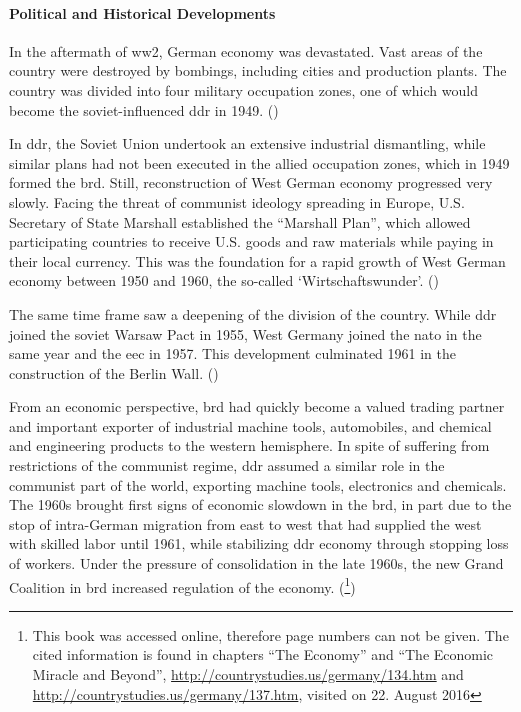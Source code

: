 \paragraph{Political and Historical Developments}
In the aftermath of \gls{ww2}, German economy was devastated. Vast areas of the country were destroyed by bombings, including cities and production plants. The country was divided into four military occupation zones, one of which would become the soviet-influenced \gls{ddr} in 1949. (\cite{BBC.2012})

In \gls{ddr}, the Soviet Union undertook an extensive industrial dismantling, while similar plans had not been executed in the allied occupation zones, which in 1949 formed the \gls{brd}. Still, reconstruction of West German economy progressed very slowly. Facing the threat of communist ideology spreading in Europe, U.S. Secretary of State Marshall established the ``Marshall Plan'', which allowed participating countries to receive U.S. goods and raw materials while paying in their local currency. This was the foundation for a rapid growth of West German economy between 1950 and 1960, the so-called `Wirtschaftswunder'. (\cite{Kimmel.2005})

The same time frame saw a deepening of the division of the country. While \gls{ddr} joined the soviet Warsaw Pact in 1955, West Germany joined the \gls{nato} in the same year and the \gls{eec} in 1957. This development culminated 1961 in the construction of the Berlin Wall. (\cite{BBC.2012})

From an economic perspective, \gls{brd} had quickly become a valued trading partner and important exporter of industrial machine tools, automobiles, and chemical and engineering products to the western hemisphere. In spite of suffering from restrictions of the communist regime, \gls{ddr} assumed a similar role in the communist part of the world, exporting machine tools, electronics and chemicals. The 1960s brought first signs of economic slowdown in the \gls{brd}, in part due to the stop of intra-German migration from east to west that had supplied the west with skilled labor until 1961, while stabilizing \gls{ddr} economy through stopping loss of workers. Under the pressure of consolidation in the late 1960s, the new Grand Coalition in \gls{brd} increased regulation of the economy.
(\cite{Solsten.1995}\footnote{This book was accessed online, therefore page numbers can not be given. The cited information  is found in chapters ``The Economy'' and ``The Economic Miracle and Beyond'', \url{http://countrystudies.us/germany/134.htm} and \url{http://countrystudies.us/germany/137.htm}, visited on 22. August 2016})

